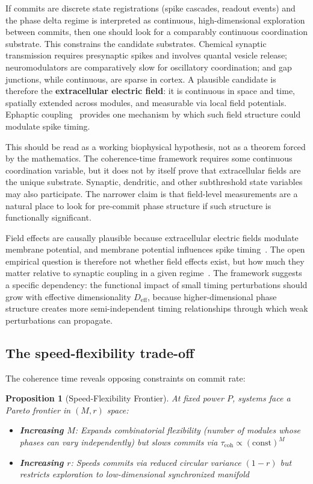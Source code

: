 \documentclass[12pt]{article}
\newtheorem{proposition}{Proposition}
\newcommand{\Deff}{D_{\mathrm{eff}}}
\begin{document}
If commits are discrete state registrations (spike cascades, readout events) and the phase delta regime is interpreted as continuous, high-dimensional exploration between commits, then one should look for a comparably continuous coordination substrate. This constrains the candidate substrates. Chemical synaptic transmission requires presynaptic spikes and involves quantal vesicle release; neuromodulators are comparatively slow for oscillatory coordination; and gap junctions, while continuous, are sparse in cortex. A plausible candidate is therefore the \textbf{extracellular electric field}: it is continuous in space and time, spatially extended across modules, and measurable via local field potentials. Ephaptic coupling~\cite{anastassiou2011,pinotsis2023,han2018} provides one mechanism by which such field structure could modulate spike timing.

This should be read as a working biophysical hypothesis, not as a theorem forced by the mathematics. The coherence-time framework requires some continuous coordination variable, but it does not by itself prove that extracellular fields are the unique substrate. Synaptic, dendritic, and other subthreshold state variables may also participate. The narrower claim is that field-level measurements are a natural place to look for pre-commit phase structure if such structure is functionally significant.

Field effects are causally plausible because extracellular electric fields modulate membrane potential, and membrane potential influences spike timing~\cite{anastassiou2011}. The open empirical question is therefore not whether field effects exist, but how much they matter relative to synaptic coupling in a given regime~\cite{anastassiou2011,beggs2003,shew2013}. The framework suggests a specific dependency: the functional impact of small timing perturbations should grow with effective dimensionality $\Deff$, because higher-dimensional phase structure creates more semi-independent timing relationships through which weak perturbations can propagate.

\subsection{The speed-flexibility trade-off}

The coherence time reveals opposing constraints on commit rate:

\begin{proposition}[Speed-Flexibility Frontier]\label{prop:tradeoff}
At fixed power $P$, systems face a Pareto frontier in $(M,r)$ space:
\begin{itemize}
\item \textbf{Increasing $M$}: Expands combinatorial flexibility (number of modules whose phases can vary independently) but slows commits via $\tau_{\mathrm{coh}} \propto (\mathrm{const})^{M}$
\item \textbf{Increasing $r$}: Speeds commits via reduced circular variance $(1-r)$ but restricts exploration to low-dimensional synchronized manifold
\end{itemize}
\end{proposition}
\end{document}
